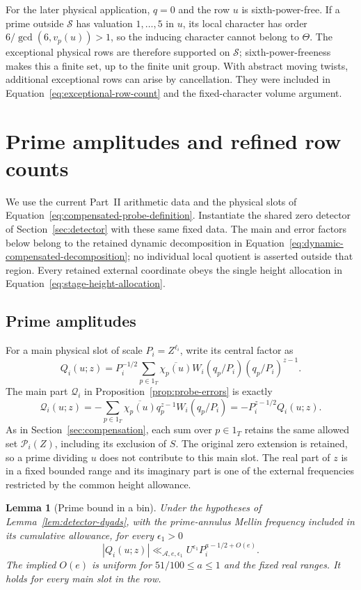 \documentclass[11pt,a4paper]{article}
\numberwithin{equation}{section}
\numberwithin{figure}{section}
\newtheorem{lemma}[theorem]{Lemma}
\theoremstyle{definition}
\theoremstyle{remark}
\begin{document}
For the later physical application, \(q=0\) and the row \(u\)
is sixth-power-free.  If a prime outside \(\mathcal S\) has
valuation \(1,\ldots,5\) in \(u\), its local character has order
\(6/\gcd(6,v_p(u))>1\), so the inducing character cannot belong
to \(\Theta\).  The exceptional physical rows are therefore
supported on \(\mathcal S\); sixth-power-freeness makes this a
finite set, up to the finite unit group.  With abstract moving
twists, additional exceptional rows can arise by cancellation.
They were included in Equation~\eqref{eq:exceptional-row-count}
and the fixed-character volume argument.
\section{Prime amplitudes and refined row counts}\label{sec:refined-row-counts}

We use the current Part~II arithmetic data and the physical slots of
Equation~\eqref{eq:compensated-probe-definition}.  Instantiate the shared
zero detector of Section~\ref{sec:detector} with these same fixed data.
The main and error factors below belong to the retained dynamic decomposition
in Equation~\eqref{eq:dynamic-compensated-decomposition}; no individual local
quotient is asserted outside that region.  Every retained external coordinate obeys
the single height allocation in Equation~\eqref{eq:stage-height-allocation}.

\subsection{Prime amplitudes}\label{sec:amplitudes}

For a main physical slot of scale \(P_i=Z^{\ell_i}\), write its
central factor as
\[
 Q_i(u;z)=P_i^{-1/2}\sum_{p\in1_T}
   \overline{\chi_p(u)}W_i(q_p/P_i)(q_p/P_i)^{z-1}.
\]
The main part \(\mathcal Q_i\) in Proposition~\ref{prop:probe-errors} is exactly
\[
 \mathcal Q_i(u;z)=-\sum_{p\in1_T}\overline{\chi_p(u)}q_p^{z-1}W_i(q_p/P_i)
 =-P_i^{z-1/2}Q_i(u;z).
\]
As in Section~\ref{sec:compensation}, each sum over \(p\in1_T\) retains
the same allowed set \(\mathcal P_i(Z)\), including its exclusion of \(S\).
The original zero extension is retained, so a prime dividing \(u\)
does not contribute to this main slot.  The real part of \(z\) is
in a fixed bounded range and its imaginary part is one of the
external frequencies restricted by the common height allowance.

\begin{lemma}[Prime bound in a bin]\label{lem:bin-prime-bound}
Under the hypotheses of Lemma~\ref{lem:detector-dyads}, with the
prime-annulus Mellin frequency included in its cumulative allowance,
for every \(\epsilon_1>0\)
\[
 |Q_i(u;z)|\ll_{\mathcal A,e,\epsilon_1}
 U^{\epsilon_1}P_i^{a-1/2+O(e)}.
\]
The implied \(O(e)\) is uniform for \(51/100\le a\le1\) and the
fixed real ranges.  It holds for every main slot in the row.
\end{lemma}
\end{document}
